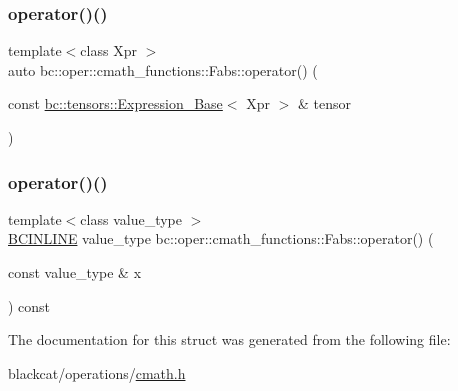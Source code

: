 \mbox{\label{structbc_1_1oper_1_1cmath__functions_1_1Fabs_a7d193d08ea5a6be88ef55f78fe3d5113}} 
\subsubsection{\texorpdfstring{operator()()}{operator()()}\hspace{0.1cm}{\footnotesize\ttfamily [2/3]}}
{\footnotesize\ttfamily template$<$class Xpr $>$ \\
auto bc\+::oper\+::cmath\+\_\+functions\+::\+Fabs\+::operator() (\begin{DoxyParamCaption}\item[{const \hyperlink{classbc_1_1tensors_1_1Expression__Base}{bc\+::tensors\+::\+Expression\+\_\+\+Base}$<$ Xpr $>$ \&}]{tensor }\end{DoxyParamCaption})\hspace{0.3cm}{\ttfamily [inline]}}

\mbox{\label{structbc_1_1oper_1_1cmath__functions_1_1Fabs_a5872f68d1c2865969966205909b3ecd6}} 
\subsubsection{\texorpdfstring{operator()()}{operator()()}\hspace{0.1cm}{\footnotesize\ttfamily [3/3]}}
{\footnotesize\ttfamily template$<$class value\+\_\+type $>$ \\
\hyperlink{common_8h_a6699e8b0449da5c0fafb878e59c1d4b1}{B\+C\+I\+N\+L\+I\+NE} value\+\_\+type bc\+::oper\+::cmath\+\_\+functions\+::\+Fabs\+::operator() (\begin{DoxyParamCaption}\item[{const value\+\_\+type \&}]{x }\end{DoxyParamCaption}) const\hspace{0.3cm}{\ttfamily [inline]}}



The documentation for this struct was generated from the following file\+:\begin{DoxyCompactItemize}
\item 
blackcat/operations/\hyperlink{cmath_8h}{cmath.\+h}\end{DoxyCompactItemize}
